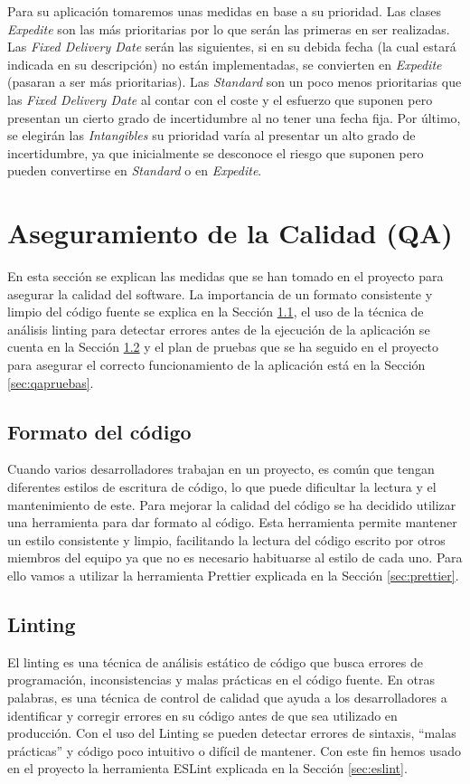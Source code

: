 Para su aplicación tomaremos unas medidas en base a su prioridad. Las clases \textit{Expedite} son las más prioritarias por lo que serán las primeras en ser realizadas. Las \textit{Fixed Delivery Date} serán las siguientes, si en su debida fecha (la cual estará indicada en su descripción) no están implementadas, se convierten en \textit{Expedite} (pasaran a ser más prioritarias). Las \textit{Standard} son un poco menos prioritarias que las \textit{Fixed Delivery Date} al contar con el coste y el esfuerzo que suponen pero presentan un cierto grado de incertidumbre al no tener una fecha fija. Por último, se elegirán las \textit{Intangibles} su prioridad varía al presentar un alto grado de incertidumbre, ya que inicialmente se desconoce el riesgo que suponen pero pueden convertirse en \textit{Standard} o en \textit{Expedite}.

\section{Aseguramiento de la Calidad (QA)}\label{sec:qa}
En esta sección se explican las medidas que se han tomado en el proyecto para asegurar la calidad del software. La importancia de un formato consistente y limpio del código fuente se explica en la Sección \ref{sec:qaformato}, el uso de la técnica de análisis linting para detectar errores antes de la ejecución de la aplicación se cuenta en la Sección \ref{sec:qalinting} y el plan de pruebas que se ha seguido en el proyecto para asegurar el correcto funcionamiento de la aplicación está en la Sección \ref{sec:qapruebas}.

\subsection{Formato del código}\label{sec:qaformato}
Cuando varios desarrolladores trabajan en un proyecto, es común que tengan diferentes estilos de escritura de código, lo que puede dificultar la lectura y el mantenimiento de este. Para mejorar la calidad del código se ha decidido utilizar una herramienta para dar formato al código. Esta herramienta permite mantener un estilo consistente y limpio, facilitando la lectura del código escrito por otros miembros del equipo ya que no es necesario habituarse al estilo de cada uno. Para ello vamos a utilizar la herramienta Prettier explicada en la Sección \ref{sec:prettier}.

\subsection{Linting}\label{sec:qalinting}
El linting es una técnica de análisis estático de código que busca errores de programación, inconsistencias y malas prácticas en el código fuente. En otras palabras, es una técnica de control de calidad que ayuda a los desarrolladores a identificar y corregir errores en su código antes de que sea utilizado en producción. Con el uso del Linting se pueden detectar errores de sintaxis, ``malas prácticas'' y código poco intuitivo o difícil de mantener. Con este fin hemos usado en el proyecto la herramienta ESLint explicada en la Sección \ref{sec:eslint}.

